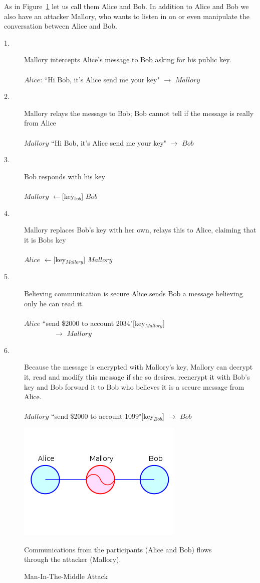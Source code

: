 \documentclass{sig-alternate}
\begin{document}
 As in Figure~\ref{MIM} let us call them Alice and Bob. In addition to Alice and Bob we also have an attacker Mallory, who wants to listen in on or even manipulate the conversation between Alice and Bob.
	\begin{description}
	\item[1.] Mallory intercepts Alice's message to Bob asking for his public key.\hfill\\\\
	$Alice$: ``Hi Bob, it's Alice send me your key" $\rightarrow$ $Mallory$
	\item[2.] Mallory relays the message to Bob; Bob cannot tell if the message is really from Alice \hfill\\\\
	 $Mallory$ ``Hi Bob, it's Alice send me your key" $\rightarrow$ $Bob$ 	
	\item[3.]Bob responds with his key \hfill\\\\
	$Mallory$ $\leftarrow$[key$_{bob}$]  $Bob$
	\item[4.] Mallory replaces Bob's key with her own, relays this to  Alice, claiming that it is Bobs key\hfill\\\\
	$Alice$ $\leftarrow$[key$_{Mallory}$] $Mallory$
	\item[5.]
	Believing communication is secure Alice sends Bob a message believing only he can read it. \hfill\\\\
	$Alice$ ``send \$2000 to account 2034"[key$_{Mallory}$] \\
	$~\quad\quad\quad\quad\rightarrow$ $Mallory$
	\item[6.] Because the message is encrypted with Mallory's key, Mallory can decrypt it, read and modify this message if she so desires, reencrypt it with Bob's key and Bob forward it to Bob who believes it is a secure message from Alice. \hfill\\\\
	$Mallory$ ``send \$2000 to account 1099"[key$_{Bob}$] $\rightarrow$ $Bob$
	\end{description}	
	\begin{figure}
		\centering
		\includegraphics[scale=.5, bb= 65 65 250 250]{MIM.jpg}
		\caption[Man-In-The-Middle Attack]{Man-In-The-Middle Attack \cite{wiki:man}}
		 Communications from the participants (Alice and Bob) flows through the attacker (Mallory).
		\label{MIM}
		\end{figure}
		
\end{document}
